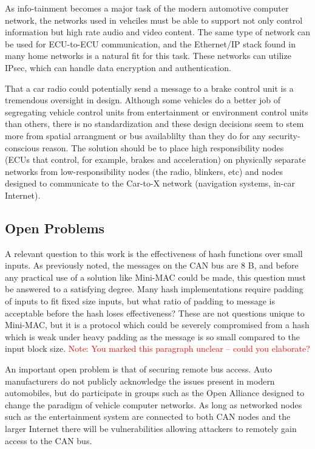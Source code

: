 As info-tainment becomes a major task of the modern automotive computer network, the networks used in vehciles must be able to support not only control information but high rate audio and video content. The same type of network can be used for ECU-to-ECU communication, and the Ethernet/IP stack found in many home networks is a natural fit for this task. These networks can utilize IPsec, which can handle data encryption and authentication.

That a car radio could potentially send a message to a brake control unit is a tremendous oversight in design. Although some vehicles do a better job of segregating vehicle control units from entertainment or environment control units than others, there is no standardization and these design decisions seem to stem more from spatial arrangment or bus availablilty than they do for any security-conscious reason. The solution should be to place high responsibility nodes (ECUs that control, for example, brakes and acceleration) on physically separate networks from low-responsibility nodes (the radio, blinkers, etc) and nodes designed to communicate to the Car-to-X network (navigation systems, in-car Internet).


\subsection{Open Problems}
A relevant question to this work is the effectiveness of hash functions over small inputs. As previously noted, the messages on the CAN bus are 8 B, and before any practical use of a solution like Mini-MAC could be made, this question must be answered to a satisfying degree. Many hash implementations require padding of inputs to fit fixed size inputs, but what ratio of padding to message is acceptable before the hash loses effectiveness? These are not questions unique to Mini-MAC, but it is a protocol which could be severely compromised from a hash which is weak under heavy padding as the message is so small compared to the input block size. \textcolor{red}{Note: You marked this paragraph unclear -- could you elaborate?}

An important open problem is that of securing remote bus access. Auto manufacturers do not publicly acknowledge the issues present in modern automobiles, but do participate in groups such as the Open Alliance designed to change the paradigm of vehicle computer networks. As long as networked nodes such as the entertainment system are connected to both CAN nodes and the larger Internet there will be vulnerabilities allowing attackers to remotely gain access to the CAN bus.


